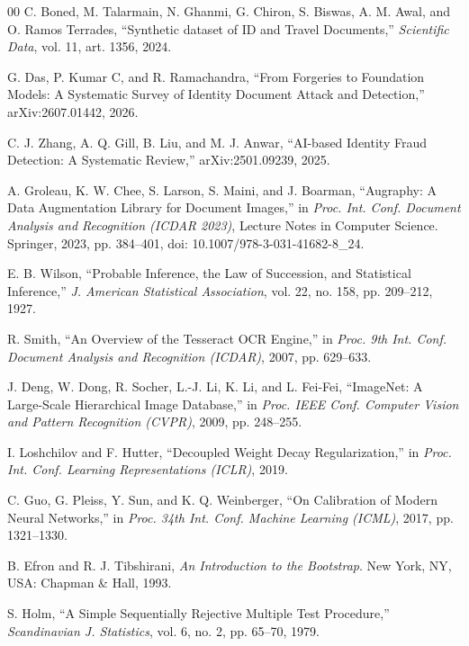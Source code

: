 \documentclass[conference]{IEEEtran}
\begin{document}
\begin{thebibliography}{00}
 C. Boned, M. Talarmain, N. Ghanmi, G. Chiron,
S. Biswas, A. M. Awal, and O. Ramos Terrades, ``Synthetic dataset of
ID and Travel Documents,'' \emph{Scientific Data}, vol. 11, art. 1356,
2024.

 G. Das, P. Kumar C, and R. Ramachandra, ``From
Forgeries to Foundation Models: A Systematic Survey of Identity
Document Attack and Detection,'' arXiv:2607.01442, 2026.

 C. J. Zhang, A. Q. Gill, B. Liu, and M. J. Anwar,
``AI-based Identity Fraud Detection: A Systematic Review,''
arXiv:2501.09239, 2025.

 A. Groleau, K. W. Chee, S. Larson, S. Maini, and
J. Boarman, ``Augraphy: A Data Augmentation Library for Document
Images,'' in \emph{Proc. Int. Conf. Document Analysis and Recognition
(ICDAR 2023)}, Lecture Notes in Computer Science. Springer,
2023, pp. 384--401, doi: 10.1007/978-3-031-41682-8\_24.

 E. B. Wilson, ``Probable Inference, the Law of
Succession, and Statistical Inference,'' \emph{J. American Statistical
Association}, vol. 22, no. 158, pp. 209--212, 1927.

 R. Smith, ``An Overview of the Tesseract OCR
Engine,'' in \emph{Proc. 9th Int. Conf. Document Analysis and
Recognition (ICDAR)}, 2007, pp. 629--633.

 J. Deng, W. Dong, R. Socher, L.-J. Li, K. Li, and
L. Fei-Fei, ``ImageNet: A Large-Scale Hierarchical Image Database,'' in
\emph{Proc. IEEE Conf. Computer Vision and Pattern Recognition (CVPR)},
2009, pp. 248--255.

 I. Loshchilov and F. Hutter, ``Decoupled Weight
Decay Regularization,'' in \emph{Proc. Int. Conf. Learning
Representations (ICLR)}, 2019.

 C. Guo, G. Pleiss, Y. Sun, and K. Q. Weinberger, ``On
Calibration of Modern Neural Networks,'' in \emph{Proc. 34th Int. Conf.
Machine Learning (ICML)}, 2017, pp. 1321--1330.

 B. Efron and R. J. Tibshirani, \emph{An Introduction
to the Bootstrap}. New York, NY, USA: Chapman \& Hall, 1993.

 S. Holm, ``A Simple Sequentially Rejective Multiple
Test Procedure,'' \emph{Scandinavian J. Statistics}, vol. 6, no. 2,
pp. 65--70, 1979.

\end{thebibliography}
\end{document}
